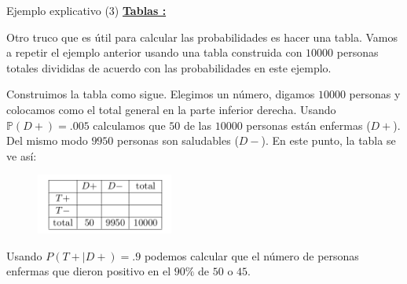 \documentclass[10pt]{beamer}
\begin{document}
\begin{frame}{Ejemplo explicativo (3)}
\small\underline{\textbf{Tablas :}}{ Otro truco que es \'util para calcular las probabilidades es hacer una tabla. Vamos a repetir el ejemplo anterior usando una tabla construida con $10000$ personas totales divididas de acuerdo con las probabilidades en este ejemplo.

Construimos la tabla como sigue. Elegimos un n\'umero, digamos $10000$ personas  y colocamos  como el total general en la parte inferior derecha. Usando $\mathbb{P}(D +) = .005$ calculamos que $50$ de las $10000$ personas est\'an enfermas ($D+$). Del mismo modo $9950$ personas son saludables ($D-$). En este punto, la tabla se ve as\'i:

\begin{figure}[h]
	\centering
	\includegraphics[width=4.5cm]{g8}
\end{figure}

Usando $P(T+|D +) = .9$ podemos calcular que el n\'umero de personas enfermas que dieron positivo en el $90\%$ de $50$ o $45$.
}
\end{frame}
\end{document}
